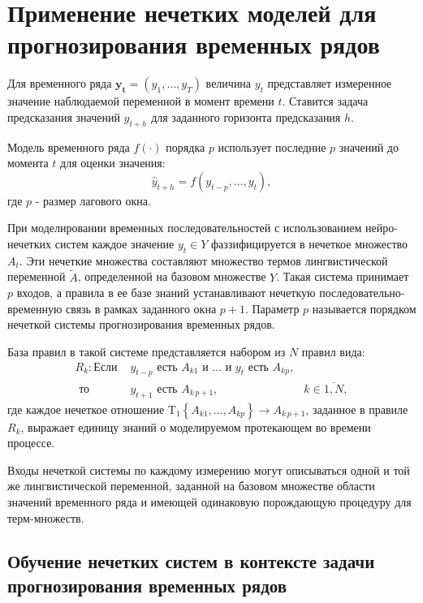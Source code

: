\section{Применение нечетких моделей для прогнозирования временных рядов}

Для временного ряда $\mathbf{y_t} = (y_1, \dots, y_T)$ величина $y_t$ представляет измеренное значение наблюдаемой переменной в момент времени $t$. Ставится задача предсказания значений $\hat{y}_{t+h}$ для заданного горизонта предсказания $h$.

Модель временного ряда $f(\cdot)$ порядка $p$ использует последние $p$ значений до момента $t$ для оценки значения:
\[
\hat{y}_{t+h} = f(y_{t-p}, \dots, y_t),
\]
где $p$ - размер лагового окна.

При моделировании временных последовательностей с использованием нейро-нечетких систем каждое значение $y_t\in Y$ фаззифицируется в нечеткое множество $A_t$. Эти нечеткие множества составляют множество термов лингвистической переменной $\tilde{A}$, определенной на базовом множестве $Y$. Такая система принимает $p$ входов, а правила в ее базе знаний устанавливают нечеткую последовательно-временную связь в рамках заданного окна $p+1$. Параметр $p$ называется порядком нечеткой системы прогнозирования временных рядов.

База правил в такой системе представляется набором из $N$ правил вида:
\begin{equation}
	\begin{aligned}
		R_k: \textrm{Если }&y_{t-p}\textrm{ есть }A_{k1}\textrm{ и }\dots\textrm{ и } y_{t}\textrm{ есть }A_{kp},&\\
		\textrm{ то }&y_{t+1}\textrm{ есть }A_{k\,p+1},&k\in\overline{1,N},
	\end{aligned}
\end{equation}
где каждое нечеткое отношение $\mathrm{T_1}\left\{A_{k1}, \dots, A_{kp}\right\} \rightarrow A_{k\,p+1}$, заданное в правиле $R_k$, выражает единицу  знаний о моделируемом протекающем во времени процессе.

Входы нечеткой системы по каждому измерению могут описываться одной и той же лингвистической переменной, заданной на базовом множестве области значений временного ряда и имеющей одинаковую порождающую процедуру для терм-множеств.

\subsection{Обучение нечетких систем в контексте задачи прогнозирования временных рядов}

